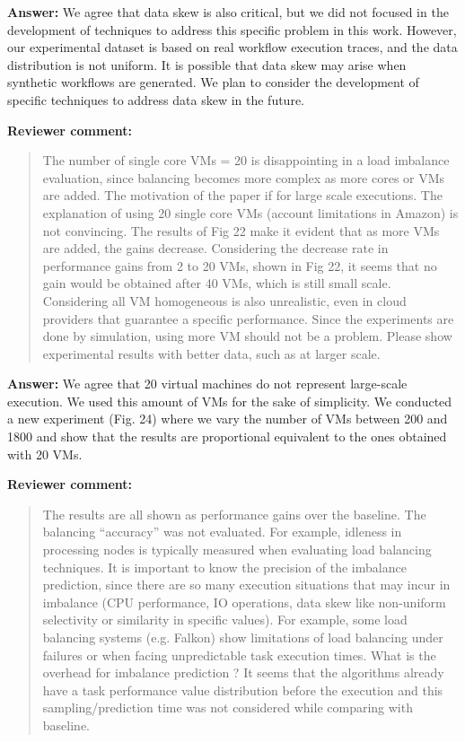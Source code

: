 \documentclass{letter}
\newenvironment{review}%
{\textbf{Reviewer comment:}\begin{quote}}%
{\end{quote}}%
\newcommand{\answer}[1]{%
      \textbf{Answer:} #1}
\begin{document}
\begin{letter}{}
\answer{We agree that data skew is also critical, but we did not focused in the development of techniques to address this specific problem in this work. However, our experimental dataset is based on real workflow execution traces, and the data distribution is not uniform. It is possible that data skew may arise when synthetic workflows are generated. We plan to consider the development of specific techniques to address data skew in the future.}


\begin{review}
The number of single core VMs = 20 is disappointing in a load imbalance evaluation, since balancing becomes more complex as more cores or VMs are added. The motivation of the paper if for large scale executions. The explanation of using 20 single core VMs (account limitations in Amazon) is not convincing. The results of Fig 22 make it evident that as more VMs are added, the gains decrease. Considering the decrease rate in performance gains from 2 to 20 VMs, shown in Fig 22, it seems that no gain would be obtained after 40 VMs, which is still small scale. Considering all VM homogeneous is also unrealistic, even in cloud providers that guarantee a specific performance. Since the experiments are done by simulation, using more VM should not be a problem. Please show experimental results with better data, such as at larger scale. 
\end{review}

\answer{We agree that 20 virtual machines do not represent large-scale execution. We used this amount of VMs for the sake of simplicity. We conducted a new experiment (Fig. 24) where we vary the number of VMs between 200 and 1800 and show that the results are proportional equivalent to the ones obtained with 20 VMs.}


\begin{review}
The results are all shown as performance gains over the baseline. The balancing ``accuracy'' was not evaluated. For example, idleness in processing nodes is typically measured when evaluating load balancing techniques. It is important to know the precision of the imbalance prediction, since there are so many execution situations that may incur in imbalance (CPU performance, IO operations, data skew like non-uniform selectivity or similarity in specific values). For example, some load balancing systems (e.g. Falkon) show limitations of load balancing under failures or when facing unpredictable task execution times. What is the overhead for imbalance prediction ? It seems that the algorithms already have a task performance value distribution before the execution and this sampling/prediction time was not considered while comparing with baseline.
\end{review}


\end{letter}
\end{document}

